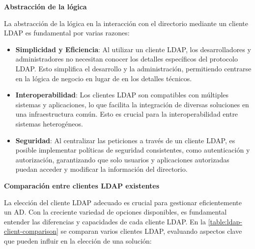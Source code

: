 \textbf{Abstracción de la lógica}

La abstracción de la lógica en la interacción con el directorio mediante un cliente LDAP es fundamental por varias razones:

\begin{itemize}
    \item \textbf{Simplicidad y Eficiencia}: Al utilizar un cliente LDAP, los desarrolladores y administradores no necesitan conocer los detalles específicos del protocolo LDAP. Esto simplifica el desarrollo y la administración, permitiendo centrarse en la lógica de negocio en lugar de en los detalles técnicos.
    \item \textbf{Interoperabilidad}: Los clientes LDAP son compatibles con múltiples sistemas y aplicaciones, lo que facilita la integración de diversas soluciones en una infraestructura común. Esto es crucial para la interoperabilidad entre sistemas heterogéneos.
    \item \textbf{Seguridad}: Al centralizar las peticiones a través de un cliente LDAP, es posible implementar políticas de seguridad consistentes, como autenticación y autorización, garantizando que solo usuarios y aplicaciones autorizadas puedan acceder y modificar la información del directorio.
\end{itemize}

\textbf{Comparación entre clientes LDAP existentes}

La elección del cliente LDAP adecuado es crucial para gestionar eficientemente un AD. Con la creciente variedad de opciones disponibles, es fundamental entender las diferencias y capacidades de cada cliente LDAP.
En la \autoref{table:ldap-client-comparison} se comparan varios clientes LDAP, evaluando aspectos clave que pueden influir en la elección de una solución:

